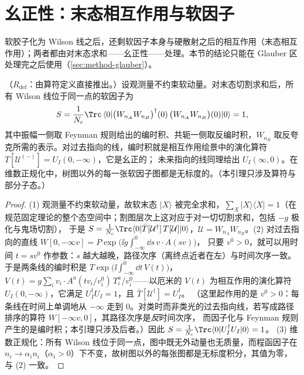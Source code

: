 \section{幺正性：末态相互作用与软因子}\label{sec:method-unitarity}

软胶子化为 Wilson 线之后，还剩软因子本身与硬散射之后的相互作用（末态相互作用）；两者都由对末态求和——幺正性——处理。本节的结论只能在 Glauber 区处理完之后使用（\cref{sec:method-glauber}）。

\begin{lemma}\label{lem:method-soft-unitarity}
（$R_{\mathrm{def}}$：由算符定义直接推出。）设观测量不约束软动量。对末态切割求和后，所有 Wilson 线位于同一点的软因子为
\begin{equation}\label{eq:method-soft-one}
S=\frac1{N_c}\Trc\,\langle0|\bigl(W_{n_A}W_{n_B}\bigr)^\dagger(0)\,\bigl(W_{n_A}W_{n_B}\bigr)(0)|0\rangle=1 ,
\end{equation}
其中振幅一侧取 Feynman 规则给出的编时积、共轭一侧取反编时积，$W_{n_B}$ 取反夸克所需的表示。对过去指向的线，编时积就是相互作用绘景中的演化算符 $T[\mathcal U^{(-)}]=U_I(0,-\infty)$，它是幺正的；
未来指向的线同理给出 $U_I(\infty,0)$。在维数正规化中，树图以外的每一张软因子图都是无标度的。（本引理只涉及算符与部分子态。）
\end{lemma}

\begin{proof}
(1) 观测量不约束软动量，故软末态 $|X\rangle$ 被完全求和，$\sum_X|X\rangle\langle X|=1$（在规范固定理论的整个态空间中；割图层次上这对应于对一切切割求和，包括 $-g$ 极化与鬼场切割），
于是 $S=\frac1{N_c}\Trc\langle0|\bar T[\mathcal U^\dagger]\,T[\mathcal U]|0\rangle$，$\mathcal U=W_{n_A}W_{n_B}$。(2) 对过去指向的直线 $W[0,-\infty v]=P\exp\bigl(\ii g\int_{-\infty}^0\dd s\,v\cdot A(sv)\bigr)$，
只要 $v^0>0$，就可以用时间 $t=sv^0$ 作参数：$s$ 越大越晚，路径次序（离终点近者在左）与时间次序一致。于是两条线的编时积是
$T\exp\bigl(\ii\int_{-\infty}^0\dd t\,V(t)\bigr)$，$V(t)=g\sum_iv_i\cdot A^a(tv_i/v_i^0)\,T_i^a/v_i^0$——以厄米的 $V(t)$ 为相互作用的演化算符 $U_I(0,-\infty)$，它满足 $U_I^\dagger U_I=1$，且 $\bar T[\mathcal U^\dagger]=U_I^\dagger$。
（这里起作用的是 $v^0>0$：每条线在时间上单调地从 $-\infty$ 走到 $0$。对类时而非类光的过去指向线，若写成路径排序的算符 $W[-\infty v,0]$，其路径次序是\emph{反}时间次序，
而因子化与 Feynman 规则产生的是编时积；本引理只涉及后者。）因此 $S=\frac1{N_c}\Trc\langle0|U_I^\dagger U_I|0\rangle=1$。
(3) 维数正规化：所有 Wilson 线位于同一点，图中既无外动量也无质量，而程函因子在 $n_i\to\alpha_in_i$（$\alpha_i>0$）下不变，故树图以外的每张图都是无标度积分，其值为零，与 (2) 一致。
\end{proof}

